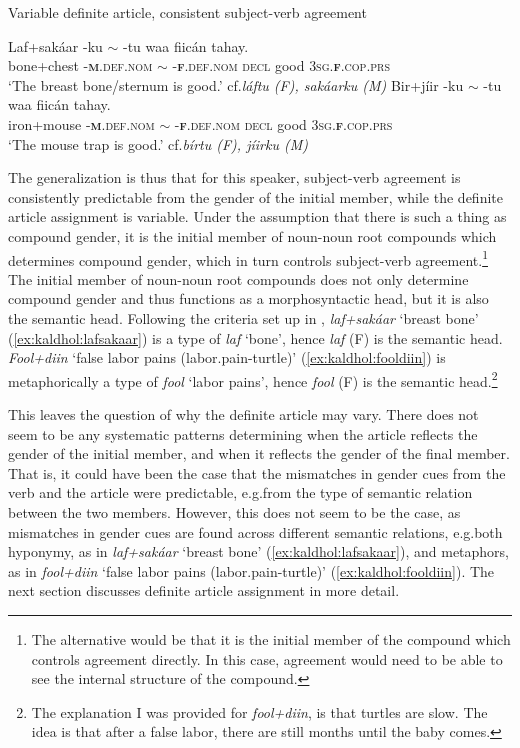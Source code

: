 \documentclass[output=paper]{langscibook}
\begin{document}
\ea\label{ex:kaldhol:variable}
	Variable definite article, consistent subject-verb agreement
	\begin{xlist}
			\ex\label{ex:kaldhol:lafsakaar}
			\gll Laf+sakáar -ku $\sim$ -tu waa fiicán tahay.\\
			bone+chest -\textsc{\textbf{m}.def.nom} $\sim$ -\textsc{\textbf{f}.def.nom} \textsc{decl} good \textsc{3sg.\textbf{f}}.\textsc{cop.prs}\\
			\trans `The breast bone/sternum is good.' \hfill cf.\@ \textit{láftu (F), sakáarku (M)}
			\ex
			\gll Bir+jíir -ku $\sim$ -tu waa fiicán tahay.\\
			iron+mouse -\textsc{\textbf{m}.def.nom} $\sim$ -\textsc{\textbf{f}.def.nom} \textsc{decl} good \textsc{3sg.\textbf{f}}.\textsc{cop.prs}\\
			\trans `The mouse trap is good.' \hfill cf.\@ \textit{bírtu (F), jíirku (M)}
	\end{xlist}
\z
The generalization is thus that for this speaker, subject-verb agreement is consistently predictable from the gender of the initial member, while the definite article assignment is variable. Under the assumption that there is such a thing as compound gender, it is the initial member of noun-noun root compounds which determines compound gender, which in turn controls subject-verb agreement.\footnote{The alternative would be that it is the initial member of the compound which controls agreement directly. In this case, agreement would need to be able to see the internal structure of the compound.} 
The initial member of noun-noun root compounds does not only determine compound gender and thus functions as a morphosyntactic head, but it is also the semantic head. Following the criteria set up in , \textit{laf+sak\'aar} `breast bone' (\ref{ex:kaldhol:lafsakaar}) is a type of \textit{laf} `bone', hence \textit{laf} (F) is the semantic head. \textit{Fool+diin} `false labor pains (labor.pain-turtle)' (\ref{ex:kaldhol:fooldiin}) is metaphorically a type of \textit{fool} `labor pains', hence \textit{fool} (F) is the semantic head.\footnote{The explanation I was provided for \textit{fool+diin}, is that turtles are slow. The idea is that after a false labor, there are still months until the baby comes.}

This leaves the question of why the definite article may vary. There does not seem to be any systematic patterns determining when the article reflects the gender of the initial member, and when it reflects the gender of the final member. That is, it could have been the case that the mismatches in gender cues from the verb and the article were predictable, e.g.\@ from the type of semantic relation between the two members. However, this does not seem to be the case, as mismatches in gender cues are found across different semantic relations, e.g.\@ both hyponymy, as in \textit{laf+sak\'aar} `breast bone' (\ref{ex:kaldhol:lafsakaar}), and metaphors, as in \textit{fool+diin} `false labor pains (labor.pain-turtle)' (\ref{ex:kaldhol:fooldiin}). The next section discusses definite article assignment in more detail.
\end{document}
